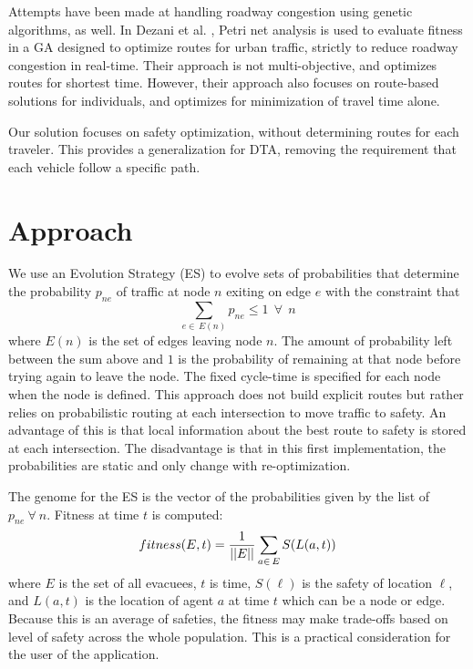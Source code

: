 \documentclass{sig-alternate-05-2015}
\begin{document}
Attempts have been made at handling roadway congestion using genetic
algorithms, as well.  In Dezani et al. \cite{dezani2014optimizing},
Petri net analysis is used to evaluate fitness in a GA designed to
optimize routes for urban traffic, strictly to reduce roadway
congestion in real-time.  Their approach is not multi-objective, and
optimizes routes for shortest time.  However, their approach also
focuses on route-based solutions for individuals, and optimizes for
minimization of travel time alone.

Our solution focuses on safety optimization, without determining
routes for each traveler.  This provides a generalization for DTA,
removing the requirement that each vehicle follow a specific path.

\section{Approach}\label{sec:approach}
We use an Evolution Strategy (ES) \cite{Eiben15} to evolve sets of
probabilities that determine the probability $p_{ne}$
of traffic at node $n$ exiting on edge $e$ with the constraint
that
\begin{equation}
\sum_{e\in\,E(n)}  p_{ne} \leq 1 ~~ \forall ~~ n
\end{equation}
\noindent
where $E(n)$ is the set of edges leaving node $n$.
The amount of probability left between the sum above and $1$ is the
probability of remaining at that node before trying again to leave the
node.  The fixed cycle-time is specified for each node when the node
is defined.  This approach does not build explicit routes but rather
relies on probabilistic routing at each intersection to move traffic
to safety.  An advantage of this is that local information about the
best route to safety is stored at each intersection. The disadvantage
is that in this first implementation, the probabilities are static and
only change with re-optimization.

The genome for the ES is the vector of the probabilities given by the
list of $p_{ne} ~\forall~ n$.  Fitness at time $t$ is computed:
\begin{equation}
fitness(E, t) = \frac{1}{||E||} \sum_{a \in\, E} S(L(a, t))
\label{eq:safety}
\end{equation}
\noindent
where $E$ is the set of all evacuees, $t$ is time, $S(\ell)$ is the
safety of location $\ell$, and $L(a, t)$ is the location of agent $a$
at time $t$ which can be a node or edge.  Because this is an average of
safeties, the fitness may make trade-offs based on level of safety
across the whole population.  This is a practical consideration for
the user of the application.
\end{document}
